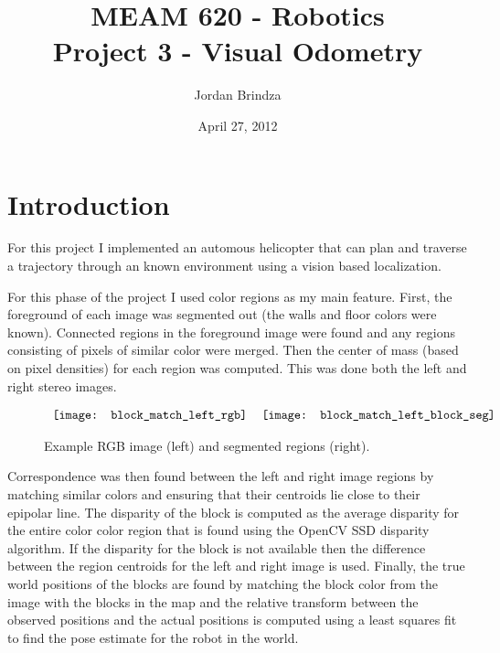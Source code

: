 \documentclass{article}
\begin{document}
\title{MEAM 620 - Robotics\\Project 3 - Visual Odometry}
\date{April 27, 2012}
\author{Jordan Brindza}
\maketitle
  

\section{Introduction}

  For this project I implemented an automous helicopter that can plan and
  traverse a trajectory through an known environment using a vision based
  localization. 

  For this phase of the project I used color regions as my main feature. First,
  the foreground of each image was segmented out (the walls and floor colors
  were known). Connected regions in the foreground image were found and any
  regions consisting of pixels of similar color were merged. Then the center of mass
  (based on pixel densities) for each region was computed. This was done both
  the left and right stereo images.

  \begin{figure}[H]
    \begin{center}$
      \begin{tabular}{cc}
        \texttt{[image: block\_match\_left\_rgb]}
        &
        \texttt{[image: block\_match\_left\_block\_seg]} 
      \end{tabular}$
    \end{center}
    \caption{Example RGB image (left) and segmented regions (right).}
  \end{figure}

  Correspondence was then found between the left and right image regions by
  matching similar colors and ensuring that their centroids lie close to their
  epipolar line. The disparity of the block is computed as the average disparity
  for the entire color color region that is found using the OpenCV SSD disparity
  algorithm. If the disparity for the block is not available then the difference
  between the region centroids for the left and right image is used. Finally, the 
  true world positions of the blocks are found by matching the block color from 
  the image with the blocks in the map and the relative transform between the
  observed positions and the actual positions is computed using a least squares
  fit to find the pose estimate for the robot in the world. ~\cite{arun}
\end{document}
